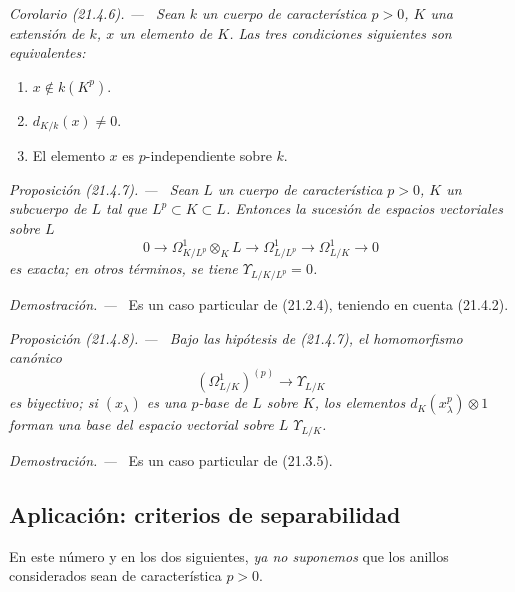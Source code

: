 \documentclass[10pt,oneside]{book}
\makeatletter
\newcommand{\setmanualcurrentlabel}[1]{\def\@currentlabel{#1}}
\newenvironment{proposition}[1][]{%
  \setmanualcurrentlabel{#1}\par\medskip\noindent\itshape Proposición (#1). ---\ }{\par}
\newenvironment{corollary}[1][]{%
  \setmanualcurrentlabel{#1}\par\medskip\noindent\itshape Corolario (#1). ---\ }{\par}
\newenvironment{proof}{%
  \par\medskip\noindent\textit{Demostración. ---\ }}{\par}
\makeatother
\begin{document}
\begin{corollary}[21.4.6]
\label{0.21.4.6-es}
Sean $k$ un cuerpo de característica $p>0$, $K$ una extensión de $k$,
$x$ un elemento de $K$. Las tres condiciones siguientes son equivalentes:
\begin{enumerate}
  \item[\textup{a)}] $x\notin k(K^p)$.
  \item[\textup{b)}] $d_{K/k}(x)\neq0$.
  \item[\textup{c)}] El elemento $x$ es $p$-independiente sobre $k$.
\end{enumerate}
\end{corollary}

\begin{proposition}[21.4.7]
\label{0.21.4.7-es}
Sean $L$ un cuerpo de característica $p>0$, $K$ un subcuerpo de $L$ tal
que $L^p\subset K\subset L$. Entonces la sucesión de espacios vectoriales sobre $L$
\begin{equation}
\tag{21.4.7.1}\label{0.21.4.7.1-es}
0\to\Omega^1_{K/L^p}\otimes_KL\to\Omega^1_{L/L^p}
\to\Omega^1_{L/K}\to0
\end{equation}
es exacta; en otros términos, se tiene $\Upsilon_{L/K/L^p}=0$.
\end{proposition}
\begin{proof}
Es un caso particular de (21.2.4), teniendo en cuenta (21.4.2).
\end{proof}

\begin{proposition}[21.4.8]
\label{0.21.4.8-es}
Bajo las hipótesis de (21.4.7), el homomorfismo canónico
\begin{equation}
\tag{21.4.8.1}\label{0.21.4.8.1-es}
(\Omega^1_{L/K})^{(p)}\longrightarrow\Upsilon_{L/K}
\end{equation}
es biyectivo; si $(x_\lambda)$ es una $p$-base de $L$ sobre $K$, los elementos
$d_K(x_\lambda^p)\otimes1$ forman una base del espacio vectorial sobre $L$ $\Upsilon_{L/K}$.
\end{proposition}
\begin{proof}
Es un caso particular de (21.3.5).
\end{proof}

\subsection{Aplicación: criterios de separabilidad}
\label{0.21.5-es}

En este número y en los dos siguientes, \emph{ya no suponemos} que los anillos
considerados sean de característica $p>0$.
\end{document}
